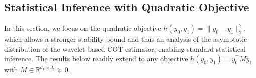 \documentclass{article}
\theoremstyle{plain}
\newtheorem{theorem}{Theorem}[section]
\theoremstyle{definition}
\def\RR{\mathbb{R}}
\theoremstyle{plain}
\newcommand{\zg}[1]{{\color{blue} [ZG: #1]}}
\def\RR{\mathbb{R}}
\begin{document}












\subsection{Statistical Inference with Quadratic Objective}\label{sec:inference}

In this section, we focus on the quadratic objective $h(y_0, y_1) = \|y_0 - y_1\|_2^2$, which allows a stronger stability bound and thus 
an analysis of the asymptotic distribution of the wavelet-based COT estimator, enabling standard statistical inference.
The results below readily extend to any objective $h(y_0,y_1)=y_0^\top M y_1$ with $M \in \RR^{d_Y \times d_Y} \succeq 0$.
\end{document}
